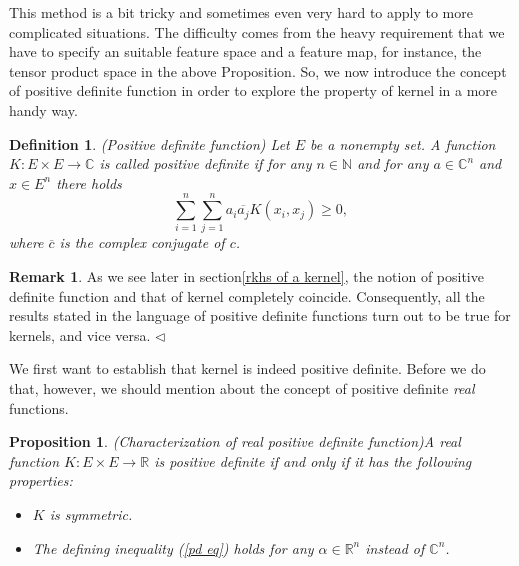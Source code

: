 \documentclass[a4paper,12pt]{article}
\newtheorem{prp}[thm]{Proposition}
\newtheorem{dfn}[thm]{Definition}
\theoremstyle{remark}
\theoremstyle{definition}
\newtheorem{rem}[thm]{Remark}
\theoremstyle{definition}
\theoremstyle{definition}
\newcommand{\fin}{\hfill \( \triangleleft \) }
\begin{document}
This method is a bit tricky and sometimes even very hard to apply to more complicated situations. The difficulty comes from the heavy requirement that we have to specify an suitable feature space and a feature map, for instance, the tensor product space in the above Proposition. So, we now introduce the concept of positive definite function in order to explore the property of kernel in a more handy way.
\begin{dfn} (Positive definite function)
	Let \( E \) be a nonempty set.
	A function \( K: E \times E \to \mathbb{C} \) is called positive definite if for any \( n \in \mathbb{N} \) and for any \( a \in \mathbb{C}^n \) and \( x \in E^n \) there holds
	\begin{equation}
		\sum_{i=1}^{n} \sum_{j=1}^{n} a_i \overline{a_j}K(x_i,x_j) \ge 0, \label{pd eq}
	\end{equation}
	where \( \overline{c} \) is the complex conjugate of \( c \).
\end{dfn}

\begin{rem}
	As we see later in section\ref{rkhs of a kernel}, the notion of positive definite function and that of kernel completely coincide. Consequently, all the results stated in the language of positive definite functions turn out to be true for kernels, and vice versa.
	\fin\end{rem}

We first want to establish that kernel is indeed positive definite. Before we do that, however, we should mention about the concept of positive definite \textit{real} functions.
\begin{prp} (Characterization of real positive definite function)\label{chara real pd}
	A real function \( K:E \times E \to \mathbb{R} \) is positive definite if and only if it has the following properties:
	\begin{itemize}
		\item[(a)] \( K \) is symmetric.
		\item[(b)] The defining inequality (\ref{pd eq}) holds for any \( \alpha \in \mathbb{R}^n \) instead of \( \mathbb{C}^n \).
	\end{itemize}
\end{prp}
\end{document}
